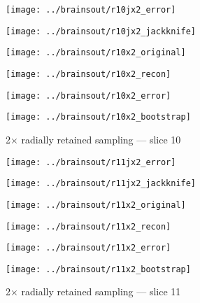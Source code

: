 \documentclass[review,supplement,onefignum,onetabnum,juq]{siamonline181217}
\begin{document}
\begin{figure}
\begin{centering}

\parbox{\imsize}{\texttt{[image: ../brainsout/r10jx2\_error]}}
\parbox{\imsize}{\texttt{[image: ../brainsout/r10jx2\_jackknife]}}

\vspace{\vertsep}

\parbox{\imsize}{\texttt{[image: ../brainsout/r10x2\_original]}}
\parbox{\imsize}{\texttt{[image: ../brainsout/r10x2\_recon]}}

\vspace{\vertsep}

\parbox{\imsize}{\texttt{[image: ../brainsout/r10x2\_error]}}
\parbox{\imsize}{\texttt{[image: ../brainsout/r10x2\_bootstrap]}}

\end{centering}
\caption{2$\times$ radially retained sampling --- slice 10}
\end{figure}


\begin{figure}
\begin{centering}

\parbox{\imsize}{\texttt{[image: ../brainsout/r11jx2\_error]}}
\parbox{\imsize}{\texttt{[image: ../brainsout/r11jx2\_jackknife]}}

\vspace{\vertsep}

\parbox{\imsize}{\texttt{[image: ../brainsout/r11x2\_original]}}
\parbox{\imsize}{\texttt{[image: ../brainsout/r11x2\_recon]}}

\vspace{\vertsep}

\parbox{\imsize}{\texttt{[image: ../brainsout/r11x2\_error]}}
\parbox{\imsize}{\texttt{[image: ../brainsout/r11x2\_bootstrap]}}

\end{centering}
\caption{2$\times$ radially retained sampling --- slice 11}
\end{figure}
\end{document}
